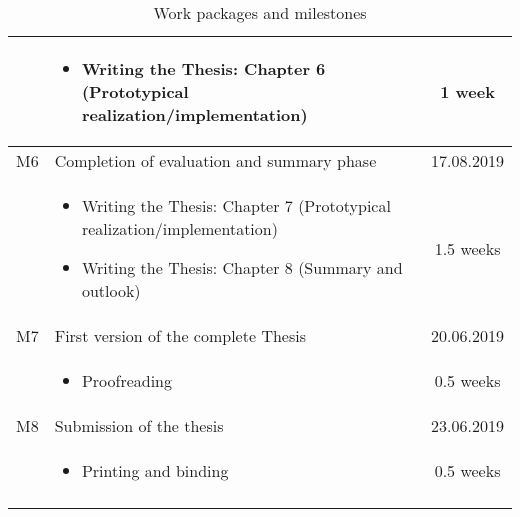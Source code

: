 \begin{flushleft}
\begin{longtable}{ | l | p{11cm} | c |}
		\hline
		& \begin{itemize}
			\item Writing the Thesis: Chapter 6 (Prototypical realization/implementation)
		\end{itemize} & 1 week \\
		\hline
		M6 & Completion of evaluation and summary phase & 17.08.2019 \\ 
		\hline
		& \begin{itemize}
			\item Writing the Thesis: Chapter 7 (Prototypical realization/implementation)
			\item Writing the Thesis: Chapter 8 (Summary and outlook)
		\end{itemize} & 1.5 weeks \\
		\hline
		M7 & First version of the complete Thesis & 20.06.2019 \\ 
		\hline
		& \begin{itemize}
			\item Proofreading
		\end{itemize} & 0.5 weeks \\
		\hline
		M8 & Submission of the thesis & 23.06.2019 \\ 
		\hline
		& \begin{itemize}
			\item Printing and binding
		\end{itemize} & 0.5 weeks \\
		\hline
		\caption{Work packages and milestones}
		\label{table:timetable}
	\end{longtable}
\end{flushleft}
